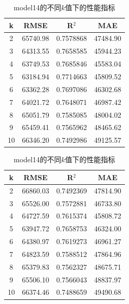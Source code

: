 \documentclass[a4paper,12pt,onecolumn,oneside]{article}
\begin{document}
	\begin{table}
		\begin{subtable}{0.45\textwidth}
			\centering
			\begin{tabular}{cccc}
				\toprule
				k & RMSE & R$^2$ & MAE \\
				\midrule
				2 & 65740.98 & 0.7578868 & 47484.90 \\
				3 & 64313.55 & 0.7658585 & 45944.23 \\
				4 & 63749.53 & 0.7685846 & 45583.04 \\
				\rowcolor{gray!25}5 & 63184.94 & 0.7714663 & 45809.52 \\
				6 & 63362.28 & 0.7697086 & 46302.68 \\
				7 & 64021.72 & 0.7648071 & 46987.42 \\
				8 & 65051.79 & 0.7585085 & 48004.02 \\
				9 & 65459.41 & 0.7565962 & 48465.62 \\
				10 & 66346.20 & 0.7492986 & 49125.57 \\
				\bottomrule
			\end{tabular}
			\caption{model13的不同$k$值下的性能指标}
			\label{tbl:model13}
		\end{subtable}
		\hfill
		\begin{subtable}{0.45\textwidth}
			\centering
				\begin{tabular}{cccc}
				\toprule
				k & RMSE & R$^2$ & MAE \\
				\midrule
				2 & 66860.03 & 0.7492369 & 47814.90\\
				3 & 65526.00 & 0.7572881 & 46733.80\\
				4 & 64727.59 & 0.7615374 & 45808.72\\
				\rowcolor{gray!25}5 & 63947.72 & 0.7658753 & 46324.00\\
				6 & 64380.97 & 0.7619273 & 46961.27\\
				7 & 64823.59 & 0.7588512 & 47864.96\\
				8 & 65379.83 & 0.7562327 & 48675.71\\
				9 & 65506.10 & 0.7566043 & 48837.97\\
				10 & 66374.46 & 0.7488659 & 49490.68\\
				\bottomrule
			\end{tabular}
			\caption{model14的不同$k$值下的性能指标}
			\label{tbl:model14}
		\end{subtable}
	\end{table}
\end{document}
